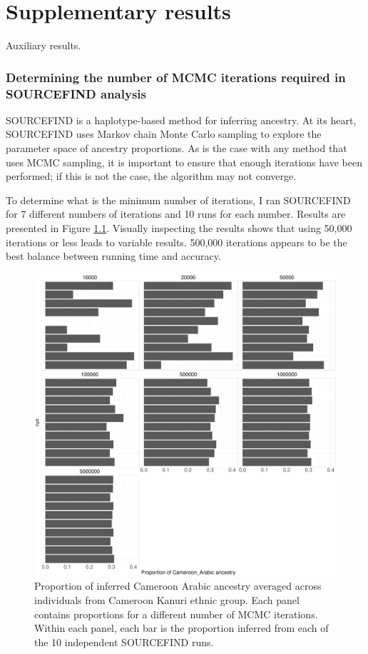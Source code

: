 \chapter{Supplementary results} \label{appendixlabel5}

Auxiliary results.

\subsection{Determining the number of MCMC iterations required in SOURCEFIND analysis} \label{sec:SF_test_iterations}

SOURCEFIND is a haplotype-based method for inferring ancestry. At its heart, SOURCEFIND uses Markov chain Monte Carlo sampling to explore the parameter space of ancestry proportions. As is the case with any method that uses MCMC sampling, it is important to ensure that enough iterations have been performed; if this is not the case, the algorithm may not converge.

To determine what is the minimum number of iterations, I ran SOURCEFIND for 7 different numbers of iterations and 10 runs for each number. Results are presented in Figure \ref{fig:iterations}. Visually inspecting the results shows that using 50,000 iterations or less leads to variable results. 500,000 iterations appears to be the best balance between running time and accuracy. 

\begin{figure}[htp]
    \centering
    \includegraphics[width=1.0\textwidth]{../images/appendix/iterations.pdf}
    \caption{Proportion of inferred Cameroon Arabic ancestry averaged across individuals from Cameroon Kanuri ethnic group. Each panel contains proportions for a different number of MCMC iterations. Within each panel, each bar is the proportion inferred from each of the 10 independent SOURCEFIND runs.}
    \label{fig:iterations}
\end{figure}

